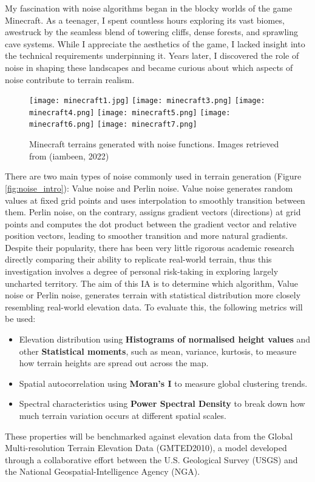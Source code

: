 My fascination with noise algorithms began in the blocky worlds of the game Minecraft. As a teenager, I spent countless
hours exploring its vast biomes, awestruck by the seamless blend of towering cliffs, dense forests, and sprawling cave systems.
While I appreciate the aesthetics of the game, I lacked insight into the technical requirements underpinning it. Years later, I 
discovered the role of noise in shaping these landscapes and became curious about which aspects of noise contribute to terrain realism. 
\begin{figure}[H]
    \centering
    \texttt{[image: minecraft1.jpg]}
    \texttt{[image: minecraft3.png]}
    \texttt{[image: minecraft4.png]}
    \texttt{[image: minecraft5.png]}
    \texttt{[image: minecraft6.png]}
    \texttt{[image: minecraft7.png]}
    \caption{Minecraft terrains generated with noise functions. Images retrieved from (iambeen, 2022)}
    \label{fig:minecraft}
\end{figure}
There are two main types of noise commonly used in terrain generation (Figure \ref{fig:noise_intro}): Value noise and Perlin noise. Value noise generates random values at fixed grid points 
and uses interpolation to smoothly transition between them. Perlin noise, on the contrary, assigns gradient vectors (directions) at grid points and computes the 
dot product between the gradient vector and relative position vectors, leading to smoother transition and more natural gradients. Despite their popularity, there 
has been very little rigorous academic research directly comparing their ability to replicate real-world terrain, thus this investigation involves a degree of 
personal risk-taking in exploring largely uncharted territory. 
The aim of this IA is to determine which algorithm, Value noise or Perlin noise, generates terrain with statistical distribution more closely resembling
real-world elevation data. To evaluate this, the following metrics will be used:
\begin{itemize}
    \item Elevation distribution using \textbf{Histograms of normalised height values} and other \textbf{Statistical moments}, such as mean, variance, kurtosis, to measure how terrain heights are spread out across the map.
    \item Spatial autocorrelation using \textbf{Moran's I} to measure global clustering trends.
    \item Spectral characteristics using \textbf{Power Spectral Density} to break down how much terrain variation occurs at different spatial scales.
\end{itemize}
These properties will be benchmarked against elevation data from the Global Multi-resolution Terrain Elevation Data (GMTED2010), a model developed through a
collaborative effort between the U.S. Geological Survey (USGS) and the National Geospatial-Intelligence Agency (NGA). 

